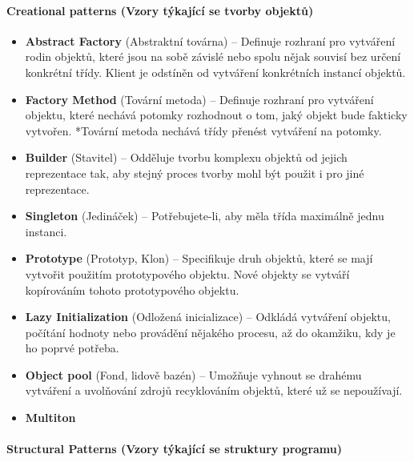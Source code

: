 \documentclass[10pt,a4paper]{article}
\begin{document}
\paragraph{Creational patterns (Vzory týkající se tvorby objektů)}
\begin{itemize}
\item \textbf{Abstract Factory} (Abstraktní továrna) – Definuje rozhraní pro vytváření rodin objektů, které jsou na sobě závislé nebo spolu nějak souvisí bez určení konkrétní třídy. Klient je odstíněn od vytváření konkrétních instancí objektů.
\item \textbf{Factory Method} (Tovární metoda) – Definuje rozhraní pro vytváření objektu, které nechává potomky rozhodnout o tom, jaký objekt bude fakticky vytvořen. *Tovární metoda nechává třídy přenést vytváření na potomky.
\item \textbf{Builder} (Stavitel) – Odděluje tvorbu komplexu objektů od jejich reprezentace tak, aby stejný proces tvorby mohl být použit i pro jiné reprezentace.
\item \textbf{Singleton} (Jedináček) – Potřebujete-li, aby měla třída maximálně jednu instanci.
\item \textbf{Prototype} (Prototyp, Klon) – Specifikuje druh objektů, které se mají vytvořit použitím prototypového objektu. Nové objekty se vytváří kopírováním tohoto prototypového objektu.
\item \textbf{Lazy Initialization} (Odložená inicializace) – Odkládá vytváření objektu, počítání hodnoty nebo provádění nějakého procesu, až do okamžiku, kdy je ho poprvé potřeba.
\item \textbf{Object pool} (Fond, lidově bazén) – Umožňuje vyhnout se drahému vytváření a uvolňování zdrojů recyklováním objektů, které už se nepoužívají.
\item \textbf{Multiton}
\end{itemize}


\paragraph{Structural Patterns (Vzory týkající se struktury programu)}
\end{document}

